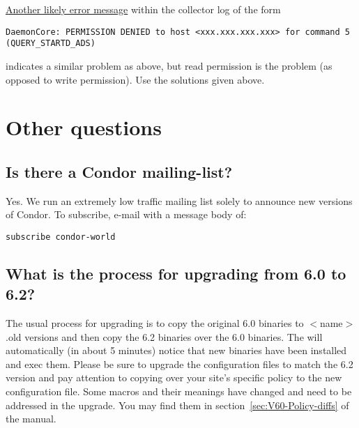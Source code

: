 \underline{Another likely error message} within the collector log of the form
\begin{verbatim}
DaemonCore: PERMISSION DENIED to host <xxx.xxx.xxx.xxx> for command 5 (QUERY_STARTD_ADS)
\end{verbatim}
indicates a similar problem as above, but read permission
is the problem (as opposed to write permission).
Use the solutions given above.

\section{Other questions}


\subsection*{Is there a Condor mailing-list?}

Yes.
We run an extremely low traffic mailing list solely to announce new
versions of Condor.
To subscribe, e-mail  with a message body
of:

\begin{verbatim}subscribe condor-world\end{verbatim}



\subsection*{What is the process for upgrading from 6.0 to 6.2?}

The usual process for upgrading is to copy the original 6.0 binaries
to $<$name$>$.old versions and then copy the 6.2 binaries over the 6.0
binaries. The  will automatically (in about 5 minutes)
notice that new binaries have been installed and exec them. Please be sure
to upgrade the configuration files to match the 6.2 version and pay attention
to copying over your site's specific policy to the new configuration file. Some
macros and their meanings have changed and need to be addressed in the
upgrade. You may find them in section~\ref{sec:V60-Policy-diffs} of the
manual.


